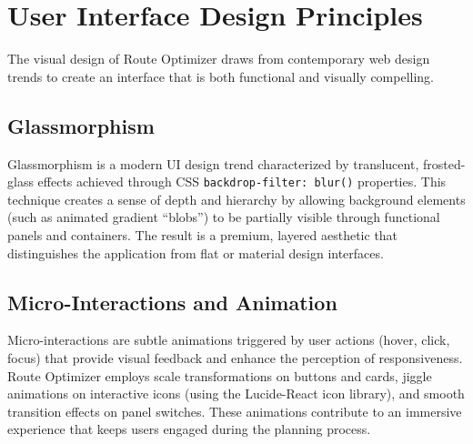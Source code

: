 \section{User Interface Design Principles}
The visual design of Route Optimizer draws from contemporary web design trends to create an interface that is both functional and visually compelling.

\subsection{Glassmorphism}
Glassmorphism is a modern UI design trend characterized by translucent, frosted-glass effects achieved through CSS \texttt{backdrop-filter: blur()} properties. This technique creates a sense of depth and hierarchy by allowing background elements (such as animated gradient ``blobs'') to be partially visible through functional panels and containers. The result is a premium, layered aesthetic that distinguishes the application from flat or material design interfaces.

\subsection{Micro-Interactions and Animation}
Micro-interactions are subtle animations triggered by user actions (hover, click, focus) that provide visual feedback and enhance the perception of responsiveness. Route Optimizer employs scale transformations on buttons and cards, jiggle animations on interactive icons (using the Lucide-React icon library), and smooth transition effects on panel switches. These animations contribute to an immersive experience that keeps users engaged during the planning process.

